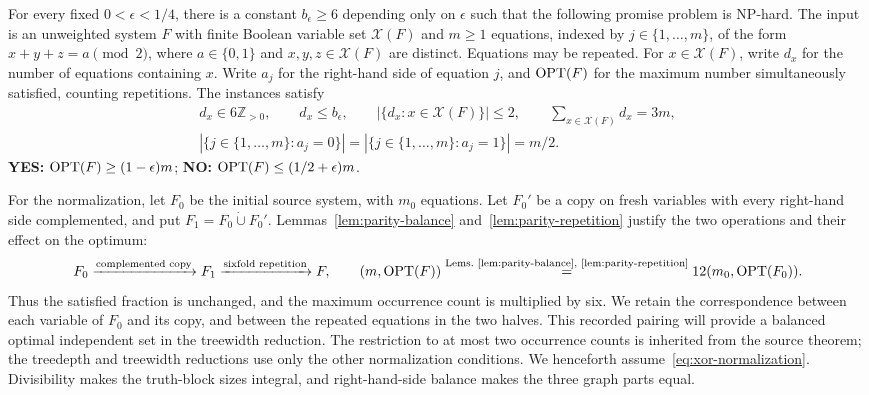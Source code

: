 \begin{theorem}\label{thm:xor-source}
For every fixed $0<\epsilon<1/4$, there is a constant
$b_\epsilon\geq6$ depending only on $\epsilon$ such that the following
promise problem is NP-hard. The input is an unweighted system $F$ with
finite Boolean variable set $\mathcal X(F)$ and $m\geq1$ equations,
indexed by $j\in\{1,\ldots,m\}$, of the form $x+y+z=a\pmod2$,
where $a\in\{0,1\}$ and $x,y,z\in\mathcal X(F)$ are distinct.
Equations may be repeated.
For $x\in\mathcal X(F)$, write $d_x$ for
the number of equations containing $x$. Write $a_j$ for the right-hand
side of equation $j$, and
$\operatorname{OPT}(F)$ for the maximum number simultaneously satisfied,
counting repetitions. The instances satisfy
\begin{equation}\label{eq:xor-normalization}
\begin{gathered}
 d_x\in6\mathbb Z_{>0},\qquad d_x\leq b_\epsilon,\qquad
 |\{d_x:x\in\mathcal X(F)\}|\leq2,\qquad
 \sum_{x\in\mathcal X(F)}d_x=3m,\\
 |\{j\in\{1,\ldots,m\}:a_j=0\}|
 =|\{j\in\{1,\ldots,m\}:a_j=1\}|=m/2.
\end{gathered}
\end{equation}
\textbf{YES:} $\operatorname{OPT}(F)\geq(1-\epsilon)m$;
\textbf{NO:} $\operatorname{OPT}(F)\leq(1/2+\epsilon)m$.
\end{theorem}

For the normalization, let $F_0$ be the initial source system, with
$m_0$ equations. Let $F_0'$ be a copy on fresh variables with every
right-hand side complemented,
and put $F_1=F_0\mathbin{\dot\cup}F_0'$. Lemmas~\ref{lem:parity-balance} and~\ref{lem:parity-repetition}
justify the two operations and their effect on the optimum:
\[
 F_0\xrightarrow{\text{complemented copy}}F_1
 \xrightarrow{\text{sixfold repetition}}F,\qquad (m,\operatorname{OPT}(F))
 \overset{\text{Lems.~\ref{lem:parity-balance}, \ref{lem:parity-repetition}}}{=}
 12(m_0,\operatorname{OPT}(F_0)).
\]
Thus the satisfied fraction is unchanged, and the maximum occurrence
count is multiplied by six.
We retain the correspondence between each variable of $F_0$ and its
copy, and between the repeated equations in the two halves. This
recorded pairing will provide a balanced optimal independent set in
the treewidth reduction. The restriction to at most two occurrence
counts is inherited from the source theorem; the treedepth and
treewidth reductions use only the other normalization conditions.
We henceforth assume~\eqref{eq:xor-normalization}. Divisibility makes
the truth-block sizes integral, and right-hand-side balance makes the
three graph parts equal.

